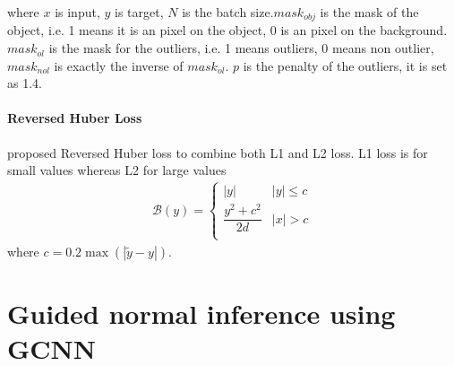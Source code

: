 \documentclass[border=15pt, multi, tikz]{article}
\begin{document}
where $ x $ is input, $ y $ is target, $ N $ is the batch size.$ mask_{obj} $ is the mask of the object, i.e. 1 means it is an pixel on the object, 0 is an pixel on the background. $ mask_{ol} $ is the mask for the outliers, i.e. 1 means outliers, 0 means non outlier, $ mask_{nol} $ is exactly the inverse of $ mask_{ol} $. $ p $ is the penalty of the outliers, it is set as 1.4.


\paragraph{Reversed Huber Loss}

\cite{berhu-loss} proposed Reversed Huber loss to combine both L1 and L2 loss. L1 loss is for small values whereas L2 for large values
\begin{equation}\label{berhu-loss}
	\begin{array}{ll}
		\mathcal{B}(y)= \begin{cases}
			|y| & |y| \le c \\
			\dfrac{y^2 + c^2}{2d} & |x| > c\\
		\end{cases}
	\end{array}
\end{equation}
where $ c=0.2\max (|\tilde y - y|) $.




\newpage

\section{Guided normal inference using GCNN}
\end{document}
